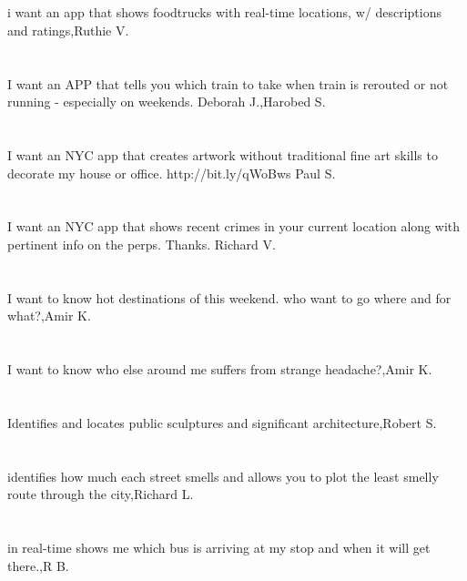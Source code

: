 \section{}i want an app that shows foodtrucks with real-time locations, w/ descriptions and ratings,Ruthie V.	
\section{}I want an APP that tells you which train to take when train is rerouted or not running - especially on weekends. Deborah J.,Harobed S.	
\section{}I want an NYC app that creates artwork without traditional fine art skills to decorate my house or office. http://bit.ly/qWoBws  Paul S.	
\section{}I want an NYC app that shows recent crimes in your current location along with pertinent info on the perps. Thanks.  Richard V.	
\section{}I want to know hot destinations of this weekend. who want to go where and for what?,Amir K.	
\section{}I want to know who else around me suffers from strange headache?,Amir K.	
\section{}Identifies and locates public sculptures and significant architecture,Robert S.	
\section{}identifies how much each street smells and allows you to plot the least smelly route through the city,Richard L.	
\section{}in real-time shows me which bus is arriving at my stop and when it will get there.,R B.	

